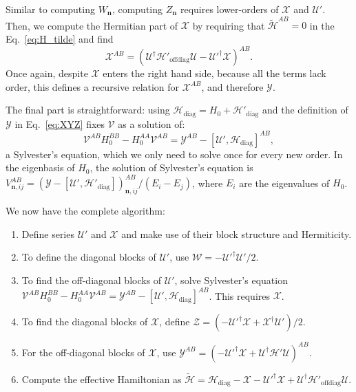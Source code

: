 %
Similar to computing $W_{\mathbf{n}}$, computing $Z_{\mathbf{n}}$ requires lower-orders of $\mathcal{X}$ and $\mathcal{U}'$.
Then, we compute the Hermitian part of $\mathcal{X}$ by requiring that $\tilde{\mathcal{H}}^{AB} = 0$ in the Eq.~\eqref{eq:H_tilde} and find
%
\begin{equation}
\label{eq:Y}
\mathcal{X}^{AB} = (\mathcal{U}^\dagger \mathcal{H}'_\textrm{offdiag} \mathcal{U} -
\mathcal{U}'^\dagger \mathcal{X})^{AB}.
\end{equation}
%
Once again, despite $\mathcal{X}$ enters the right hand side, because all the terms lack  order, this defines a recursive relation for $\mathcal{X}^{AB}$, and therefore $\mathcal{Y}$.

The final part is straightforward: using $\mathcal{H}_\textrm{diag} = H_0 + \mathcal{H}'_\textrm{diag}$ and the definition of $\mathcal{Y}$ in Eq.~\eqref{eq:XYZ} fixes $\mathcal{V}$ as a solution of:
%
\begin{equation}
\label{eq:sylvester}
\mathcal{V}^{AB}H_0^{BB} - H_0^{AA} \mathcal{V}^{AB} = \mathcal{Y}^{AB} - [\mathcal{U}', \mathcal{H}_\textrm{diag}]^{AB},
\end{equation}
%
a Sylvester's equation, which we only need to solve once for every new order.
In the eigenbasis of $H_0$, the solution of Sylvester's equation is $V^{AB}_{\mathbf{n}, ij} = (\mathcal{Y} - [\mathcal{U}', \mathcal{H}'_\textrm{diag}])^{AB}_{\mathbf{n}, ij}/(E_i - E_j)$, where $E_i$ are the eigenvalues of $H_0$.

We now have the complete algorithm:
%
\begin{enumerate}
    \item Define series $\mathcal{U}'$ and $\mathcal{X}$ and make use of their block structure and Hermiticity.
    \item To define the diagonal blocks of $\mathcal{U}'$, use $\mathcal{W} = -\mathcal{U}'^\dagger\mathcal{U}'/2$.
    \item To find the off-diagonal blocks of $\mathcal{U}'$, solve Sylvester's equation \\ $\mathcal{V}^{AB}H_0^{BB} - H_0^{AA}\mathcal{V}^{AB} = \mathcal{Y}^{AB} - [\mathcal{U}', \mathcal{H}_\textrm{diag}]^{AB}$.
      This requires $\mathcal{X}$.
    \item To find the diagonal blocks of $\mathcal{X}$, define $\mathcal{Z} = (-\mathcal{U}'^\dagger\mathcal{X} + \mathcal{X}^\dagger\mathcal{U}')/2$.
    \item For the off-diagonal blocks of $\mathcal{X}$, use $\mathcal{Y}^{AB} =
    (-\mathcal{U}'^\dagger\mathcal{X} +
     \mathcal{U}^\dagger\mathcal{H}'\mathcal{U})^{AB}$.
    \item  Compute the effective Hamiltonian as $\tilde{\mathcal{H}} = \mathcal{H}_\textrm{diag} - \mathcal{X} - \mathcal{U}'^\dagger \mathcal{X} + \mathcal{U}^\dagger\mathcal{H}'_\textrm{offdiag}\mathcal{U}$.
\end{enumerate}

